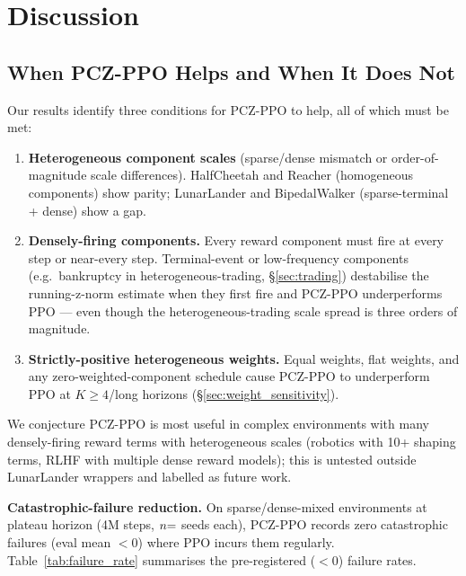 \documentclass[11pt,a4paper]{article}
\DeclareRobustCommand{\cnum}[1]{\unskip}
\begin{document}
\section{Discussion}

\subsection{When PCZ-PPO Helps and When It Does Not}

Our results identify three conditions for PCZ-PPO to help, all of which must be met:
\begin{enumerate}[leftmargin=*,itemsep=2pt]
\item \textbf{Heterogeneous component scales} (sparse/dense mismatch or order-of-magnitude scale differences). HalfCheetah and Reacher (homogeneous components) show parity; LunarLander and BipedalWalker (sparse-terminal + dense) show a gap.
\item \textbf{Densely-firing components.} Every reward component must fire at every step or near-every step. Terminal-event or low-frequency components (e.g.\ bankruptcy in heterogeneous-trading, §\ref{sec:trading}) destabilise the running-z-norm estimate when they first fire and PCZ-PPO underperforms PPO --- even though the heterogeneous-trading scale spread is three orders of magnitude.
\item \textbf{Strictly-positive heterogeneous weights.} Equal weights, flat weights, and any zero-weighted-component schedule cause PCZ-PPO to underperform PPO at $K{\geq}4$/long horizons (§\ref{sec:weight_sensitivity}).
\end{enumerate}

We conjecture PCZ-PPO is most useful in complex environments with many densely-firing reward terms with heterogeneous scales (robotics with 10+ shaping terms, RLHF with multiple dense reward models); this is untested outside LunarLander wrappers and labelled as future work.

\textbf{Catastrophic-failure reduction.} On sparse/dense-mixed environments at plateau horizon (4M steps, $n{=}\cnum{cfail_bw_n}$ seeds each), PCZ-PPO records zero catastrophic failures (eval mean ${<}0$) where PPO incurs them regularly. Table~\ref{tab:failure_rate} summarises the pre-registered ($<0$) failure rates.
\end{document}
